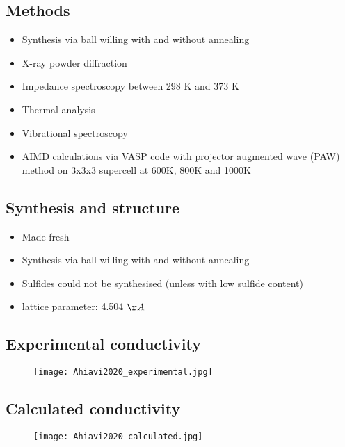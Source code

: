 \documentclass[10pt,a4paper, titlepage]{article}
\begin{document}
\subsection{Methods}

\begin{itemize}
  \item Synthesis via ball willing with and without annealing
  \item X-ray powder diffraction
  \item Impedance spectroscopy between 298 K and 373 K
  \item Thermal analysis
  \item Vibrational spectroscopy
  \item AIMD calculations via VASP code with projector augmented wave (PAW) method on 3x3x3 supercell at 600K, 800K and 1000K
\end{itemize}

\subsection{Synthesis and structure}

\begin{itemize}
  \item Made  fresh
  \item Synthesis via ball willing with and without annealing
  \item Sulfides could not be synthesised (unless with low sulfide content)
  \item {} lattice parameter: 4.504 $\AA$
\end{itemize}

\subsection{Experimental conductivity}

\begin{figure}[H]
\centering
\texttt{[image: Ahiavi2020\_experimental.jpg]}
\end{figure}

\subsection{Calculated conductivity}

\begin{figure}[H]
\centering
\texttt{[image: Ahiavi2020\_calculated.jpg]}
\end{figure}
\end{document}
